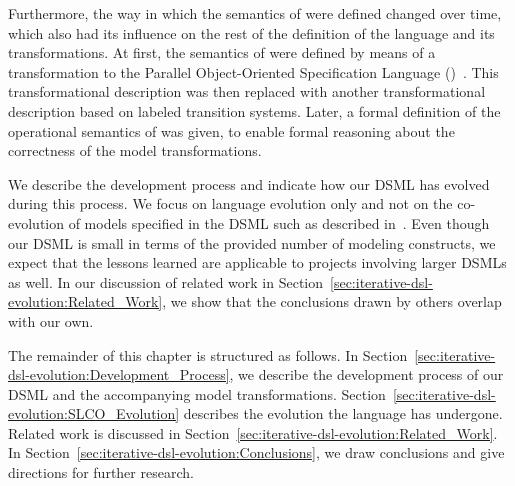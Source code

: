Furthermore, the way in which the semantics of \SLCO were defined changed over time, which also had its influence on the rest of the definition of the language and its transformations.
At first, the semantics of \SLCO were defined by means of a transformation to the Parallel Object-Oriented Specification Language (\POOSL)~\cite{Theelen2007}.
This transformational description was then replaced with another transformational description based on labeled transition systems.
Later, a formal definition of the operational semantics of \SLCO was given, to enable formal reasoning about the correctness of the model transformations.

We describe the development process and indicate how our DSML has evolved during this process.
We focus on language evolution only and not on the co-evolution of models specified in the DSML such as described in~\cite{Cicchetti2008}.
Even though our DSML is small in terms of the provided number of modeling constructs, we expect that the lessons learned are applicable to projects involving larger DSMLs as well.
In our discussion of related work in Section~\ref{sec:iterative-dsl-evolution:Related_Work}, we show that the conclusions drawn by others overlap with our own.

The remainder of this chapter is structured as follows.
In Section~\ref{sec:iterative-dsl-evolution:Development_Process}, we describe the development process of our DSML and the accompanying model transformations.
Section~\ref{sec:iterative-dsl-evolution:SLCO_Evolution} describes the evolution the language has undergone.
Related work is discussed in Section~\ref{sec:iterative-dsl-evolution:Related_Work}.
In Section~\ref{sec:iterative-dsl-evolution:Conclusions}, we draw conclusions and give directions for further research. 